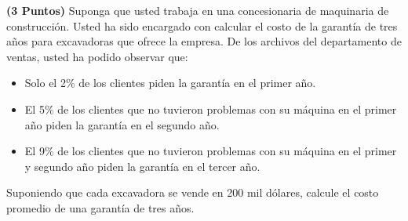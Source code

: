 \documentclass[ a4paper, twoside, 11pt]{article}
\begin{document}
\begin{problem}
\textbf{(3 Puntos)} Suponga que usted trabaja en una concesionaria de maquinaria de construcci\'on. Usted ha sido encargado con calcular el costo de la garant\'ia de tres a\~nos para excavadoras que ofrece la empresa. De los archivos del departamento de ventas, usted ha podido observar que: 
\begin{itemize}
\item Solo el 2\% de los clientes piden la garant\'ia en el primer a\~no. 
\item El 5\% de los clientes que no tuvieron problemas con su m\'aquina en el primer a\~no piden la garant\'ia en el segundo a\~no. 
\item El 9\% de los clientes que no tuvieron problemas con su m\'aquina en el primer y segundo a\~no piden la garant\'ia en el tercer a\~no. 
\end{itemize}
Suponiendo que cada excavadora se vende en 200 mil d\'olares, calcule el costo promedio de una garant\'ia de tres a\~nos. 

\end{problem}
\vspace{\baselineskip}
\end{document}
